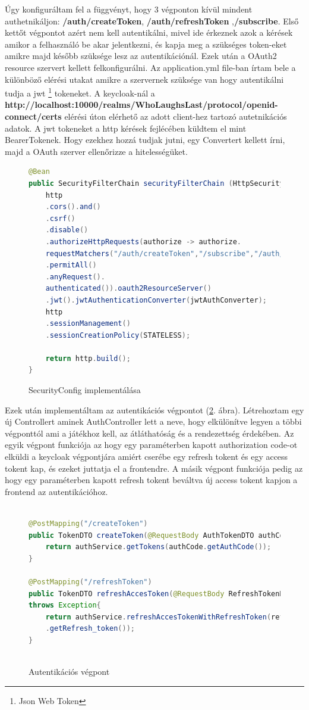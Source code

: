 \documentclass[a4paper,twoside]{article}
\begin{document}
Úgy konfiguráltam fel a függvényt, hogy 3 végponton kívül mindent authetnikáljon: \textbf{/auth/createToken}, \textbf{/auth/refreshToken} ,\textbf{/subscribe}. Első kettőt végpontot azért nem kell autentikálni, mivel ide érkeznek azok a kérések amikor a felhasználó be akar jelentkezni, és kapja meg a szükséges token-eket amikre majd később szüksége lesz az autentikációnál. Ezek után a OAuth2 resource szervert kellett felkonfigurálni. Az application.yml file-ban írtam bele a különböző elérési utakat amikre a szervernek szüksége van hogy autentikálni tudja a jwt \footnote{Json Web Token} tokeneket. A keycloak-nál a \textbf{http://localhost:10000/realms/WhoLaughsLast/protocol/openid-connect/certs} elérési úton 
elérhető az adott client-hez tartozó autetnikációs adatok. A jwt tokeneket a http kérések fejlécében küldtem el mint BearerTokenek. Hogy ezekhez hozzá tudjak jutni,
egy Convertert kellett írni, majd a OAuth szerver ellenőrizze a hitelességüket. 

\begin{figure}
	\caption{SecurityConfig implementálása}
	\centering
\begin{lstlisting}[language=java]
@Bean
public SecurityFilterChain securityFilterChain (HttpSecurity http) throws Exception{
	http
	.cors().and()
	.csrf()
	.disable()
	.authorizeHttpRequests(authorize -> authorize.
	requestMatchers("/auth/createToken","/subscribe","/auth/refreshToken")
	.permitAll()
	.anyRequest().
	authenticated()).oauth2ResourceServer()
	.jwt().jwtAuthenticationConverter(jwtAuthConverter);
	http
	.sessionManagement()
	.sessionCreationPolicy(STATELESS);
	
	return http.build();
}
\end{lstlisting}
\label{secConf}
\end{figure}
\FloatBarrier


Ezek után implementáltam az autentikációs végpontot (\ref{authEndpoint}. ábra). Létrehoztam egy új Controllert aminek AuthController lett a neve,
hogy elkülönítve legyen a többi végponttól ami a játékhoz kell, az átláthatóság és a rendezettség érdekében. Az egyik végpont 
funkciója az hogy egy paraméterben kapott authorization code-ot elküldi a keycloak végpontjára amiért cserébe egy refresh tokent és egy access tokent kap,
és ezeket juttatja el a frontendre. A másik végpont funkciója pedig az hogy egy paraméterben kapott refresh tokent beváltva új access tokent kapjon a frontend az autentikációhoz. 

\begin{figure}
	\caption{Autentikációs végpont}
	\centering
	\begin{lstlisting}[language=java]
		
@PostMapping("/createToken")
public TokenDTO createToken(@RequestBody AuthTokenDTO authCode) throws Exception{
	return authService.getTokens(authCode.getAuthCode());
}		

@PostMapping("/refreshToken")
public TokenDTO refreshAccesToken(@RequestBody RefreshTokenDTO refreshTokenDTO)
throws Exception{
	return authService.refreshAccesTokenWithRefreshToken(refreshTokenDTO
	.getRefresh_token());
}
		
	\end{lstlisting}
	\label{authEndpoint}
\end{figure} 
\end{document}
